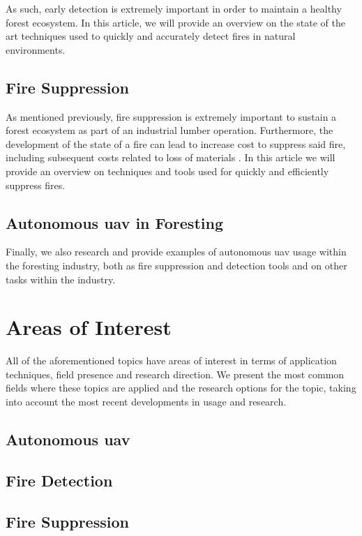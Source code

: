 \documentclass[runningheads]{llncs}
\begin{document}
As such, early detection is extremely important in order to maintain a healthy forest ecosystem. In this article, we will provide an overview on the state of the art techniques used to quickly and accurately detect fires in natural environments.

\subsection{Fire Suppression}

As mentioned previously, fire suppression is extremely important to sustain a forest ecosystem as part of an industrial lumber operation. Furthermore, the development of the state of a fire can lead to increase cost to suppress said fire, including subsequent costs related to loss of materials . In this article we will provide an overview on techniques and tools used for quickly and efficiently suppress fires.

\subsection{Autonomous \acrshort{uav} in Foresting}

Finally, we also research and provide examples of autonomous \acrshort{uav} usage within the foresting industry, both as fire suppression and detection tools and on other tasks within the industry.

\section{Areas of Interest}

All of the aforementioned topics have areas of interest in terms of application techniques, field presence and research direction. We present the most common fields where these topics are applied and the research options for the topic, taking into account the most recent developments in usage and research.

\subsection{Autonomous \acrshort{uav}}


\subsection{Fire Detection}



\subsection{Fire Suppression}
\end{document}
